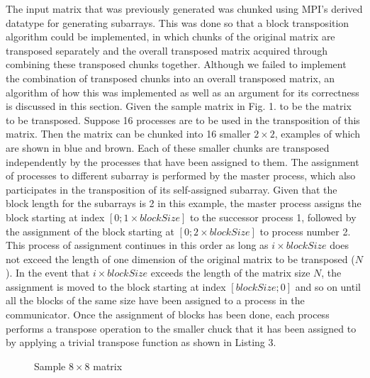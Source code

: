 \documentclass[journal]{IEEEtran}
\begin{document}
\noindent
The input matrix that was previously generated was chunked using MPI's derived datatype for generating subarrays. This was done so that a block transposition algorithm could be implemented, in which chunks of the original matrix are transposed separately and the overall transposed matrix acquired through combining these transposed chunks together. Although we failed to implement the combination of transposed chunks into an overall transposed matrix, an algorithm of how this was implemented as well as an argument for its correctness is discussed in this section. Given the sample matrix in Fig. 1. to be the matrix to be transposed. Suppose 16 processes are to be used in the transposition of this matrix. Then the matrix can be chunked into 16 smaller $2\times2$, examples of which are shown in blue and brown. Each of these smaller chunks are transposed independently by the processes that have been assigned to them. The assignment of processes to different subarray is performed by the master process, which also participates in the transposition of its self-assigned subarray. Given that the block length for the subarrays is 2 in this example, the master process assigns the block starting at index $[0;1\times blockSize]$ to the successor process 1, followed by the assignment of the block starting at $[0;2\times blockSize]$ to process number 2. This process of assignment continues in this order as long as $i\times blockSize$ does not exceed the length of one dimension of the original matrix to be transposed ($N$). In the event that $i\times blockSize$ exceeds the length of the matrix size $N$, the assignment is moved to the block starting at index $[blockSize; 0]$ and so on until all the blocks of the same size have been assigned to a process in the communicator. Once the assignment of blocks has been done, each process performs a transpose operation to the smaller chuck that it has been assigned to by applying a trivial transpose function as shown in Listing 3.

\newcommand*{\xMin}{0}%
\newcommand*{\xMax}{8}%
\newcommand*{\yMin}{0}%
\newcommand*{\yMax}{8}%
\begin{figure}
\caption{Sample $8\times8$ matrix}
\end{figure}
\end{document}
